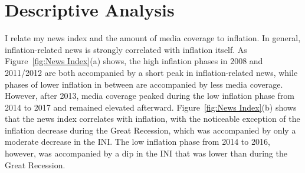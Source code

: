 \documentclass[review]{elsarticle}
\begin{document}
\section{Descriptive Analysis} \label{sec:Descriptive Analysis}
I relate my news index and the amount of media coverage to inflation. In general, inflation-related news is strongly correlated with inflation itself. As Figure~\ref{fig:News Index}(a) shows, the high inflation phases in 2008 and 2011/2012 are both accompanied by a short peak in inflation-related news, while phases of lower inflation in between are accompanied by less media coverage. However, after 2013, media coverage peaked during the low inflation phase from 2014 to 2017 and remained elevated afterward. Figure~\ref{fig:News Index}(b) shows that the news index correlates with inflation, with the noticeable exception of the inflation decrease during the Great Recession, which was accompanied by only a moderate decrease in the INI. The low inflation phase from 2014 to 2016, however, was accompanied by a dip in the INI that was lower than during the Great Recession.
\end{document}
